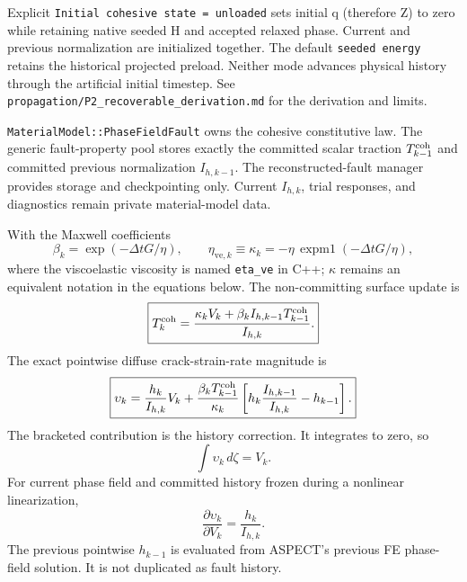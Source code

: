 \documentclass[11pt]{article}
\begin{document}
Explicit \texttt{Initial cohesive state = unloaded} sets initial q (therefore Z)
to zero while retaining native seeded H and accepted relaxed phase. Current and
previous normalization are initialized together. The default \texttt{seeded energy}
retains the historical projected preload. Neither mode advances physical history
through the artificial initial timestep. See
\texttt{propagation/P2\_recoverable\_derivation.md} for the derivation and limits.


\texttt{MaterialModel::PhaseFieldFault} owns the cohesive constitutive law.
The generic fault-property pool stores exactly the committed scalar traction
\(T^{\rm coh}_{k-1}\) and committed previous normalization
\(I_{h,k-1}\). The reconstructed-fault manager provides storage and
checkpointing only. Current \(I_{h,k}\), trial responses, and diagnostics
remain private material-model data.

With the Maxwell coefficients
\[
\beta_k=\exp(-\Delta tG/\eta),
\qquad
\eta_{\mathrm{ve},k}\equiv\kappa_k=-\eta\,\operatorname{expm1}(-\Delta tG/\eta),
\]
where the viscoelastic viscosity is named \texttt{eta\_ve} in C++;
$\kappa$ remains an equivalent notation in the equations below.
The non-committing surface update is
\[
\boxed{
T^{\rm coh}_k
=
\frac{\kappa_kV_k+
\beta_k I_{h,k-1}T^{\rm coh}_{k-1}}{I_{h,k}}.
}
\]
The exact pointwise diffuse crack-strain-rate magnitude is
\[
\boxed{
\upsilon_k
=
\frac{h_k}{I_{h,k}}V_k
+
\frac{\beta_kT^{\rm coh}_{k-1}}{\kappa_k}
\left[
h_k\frac{I_{h,k-1}}{I_{h,k}}-h_{k-1}
\right].
}
\]
The bracketed contribution is the history correction. It integrates to zero,
so
\[
\int\upsilon_k\,d\zeta=V_k.
\]
For current phase field and committed history frozen during a nonlinear
linearization,
\[
\frac{\partial\upsilon_k}{\partial V_k}
=\frac{h_k}{I_{h,k}}.
\]
The previous pointwise \(h_{k-1}\) is evaluated from ASPECT's previous FE
phase-field solution. It is not duplicated as fault history.
\end{document}
